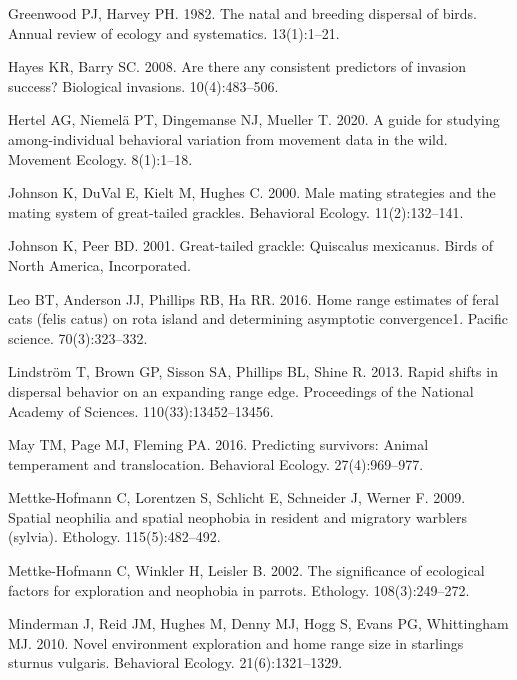 \documentclass[
]{article}
\begin{document}
\leavevmode\hypertarget{ref-greenwood1982natal}{}%
Greenwood PJ, Harvey PH. 1982. The natal and breeding dispersal of
birds. Annual review of ecology and systematics. 13(1):1--21.

\leavevmode\hypertarget{ref-hayes2008there}{}%
Hayes KR, Barry SC. 2008. Are there any consistent predictors of
invasion success? Biological invasions. 10(4):483--506.

\leavevmode\hypertarget{ref-hertel2020guide}{}%
Hertel AG, Niemelä PT, Dingemanse NJ, Mueller T. 2020. A guide for
studying among-individual behavioral variation from movement data in the
wild. Movement Ecology. 8(1):1--18.

\leavevmode\hypertarget{ref-johnson2000male}{}%
Johnson K, DuVal E, Kielt M, Hughes C. 2000. Male mating strategies and
the mating system of great-tailed grackles. Behavioral Ecology.
11(2):132--141.

\leavevmode\hypertarget{ref-johnson2001great}{}%
Johnson K, Peer BD. 2001. Great-tailed grackle: Quiscalus mexicanus.
Birds of North America, Incorporated.

\leavevmode\hypertarget{ref-leo2016home}{}%
Leo BT, Anderson JJ, Phillips RB, Ha RR. 2016. Home range estimates of
feral cats (felis catus) on rota island and determining asymptotic
convergence1. Pacific science. 70(3):323--332.

\leavevmode\hypertarget{ref-lindstrom2013rapid}{}%
Lindström T, Brown GP, Sisson SA, Phillips BL, Shine R. 2013. Rapid
shifts in dispersal behavior on an expanding range edge. Proceedings of
the National Academy of Sciences. 110(33):13452--13456.

\leavevmode\hypertarget{ref-may2016predicting}{}%
May TM, Page MJ, Fleming PA. 2016. Predicting survivors: Animal
temperament and translocation. Behavioral Ecology. 27(4):969--977.

\leavevmode\hypertarget{ref-mettke2009spatial}{}%
Mettke-Hofmann C, Lorentzen S, Schlicht E, Schneider J, Werner F. 2009.
Spatial neophilia and spatial neophobia in resident and migratory
warblers (sylvia). Ethology. 115(5):482--492.

\leavevmode\hypertarget{ref-mettke2002significance}{}%
Mettke-Hofmann C, Winkler H, Leisler B. 2002. The significance of
ecological factors for exploration and neophobia in parrots. Ethology.
108(3):249--272.

\leavevmode\hypertarget{ref-minderman2010novel}{}%
Minderman J, Reid JM, Hughes M, Denny MJ, Hogg S, Evans PG, Whittingham
MJ. 2010. Novel environment exploration and home range size in starlings
sturnus vulgaris. Behavioral Ecology. 21(6):1321--1329.
\end{document}
